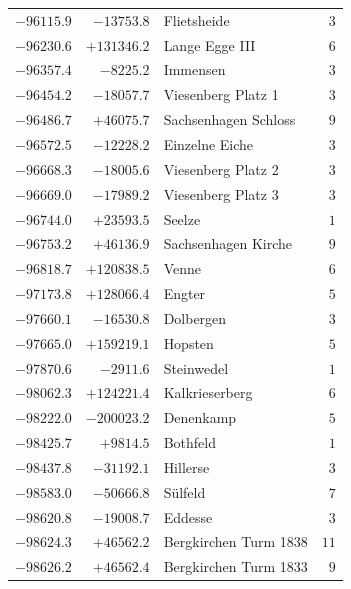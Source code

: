 \begin{center}
\begin{tabular}{r|r|p{170pt}|r}
\(-96115.9\)&\(-13753.8\)&Flietsheide&\(3\)\\
\(-96230.6\)&\(+131346.2\)&Lange Egge III&\(6\)\\
\(-96357.4\)&\(-8225.2\)&Immensen&\(3\)\\
\(-96454.2\)&\(-18057.7\)&Viesenberg Platz 1&\(3\)\\
\(-96486.7\)&\(+46075.7\)&Sachsenhagen Schloss&\(9\)\\
\(-96572.5\)&\(-12228.2\)&Einzelne Eiche&\(3\)\\
\(-96668.3\)&\(-18005.6\)&Viesenberg Platz 2&\(3\)\\
\(-96669.0\)&\(-17989.2\)&Viesenberg Platz 3&\(3\)\\
\(-96744.0\)&\(+23593.5\)&Seelze&\(1\)\\
\(-96753.2\)&\(+46136.9\)&Sachsenhagen Kirche&\(9\)\\
\(-96818.7\)&\(+120838.5\)&Venne&\(6\)\\
\(-97173.8\)&\(+128066.4\)&Engter&\(5\)\\
\(-97660.1\)&\(-16530.8\)&Dolbergen&\(3\)\\
\(-97665.0\)&\(+159219.1\)&Hopsten&\(5\)\\
\(-97870.6\)&\(-2911.6\)&Steinwedel&\(1\)\\
\(-98062.3\)&\(+124221.4\)&Kalkrieserberg&\(6\)\\
\(-98222.0\)&\(-200023.2\)&Denenkamp&\(5\)\\
\(-98425.7\)&\(+9814.5\)&Bothfeld&\(1\)\\
\(-98437.8\)&\(-31192.1\)&Hillerse&\(3\)\\
\(-98583.0\)&\(-50666.8\)&Sülfeld&\(7\)\\
\(-98620.8\)&\(-19008.7\)&Eddesse&\(3\)\\
\(-98624.3\)&\(+46562.2\)&Bergkirchen Turm 1838&\(11\)\\
\(-98626.2\)&\(+46562.4\)&Bergkirchen Turm 1833&\(9\)\\
\hline\end{tabular}\endgroup\end{center}
